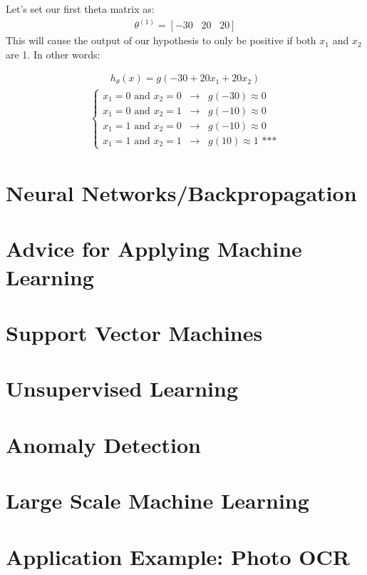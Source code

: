 \documentclass{article}
\begin{document}
            Let's set our first theta matrix as:
            \begin{align*}
                \theta^{(1)} = [-30 \; \; \; 20 \; \; \; 20]
            \end{align*}
            This will cause the output of our hypothesis to only be positive if both $x_1$ and $x_2$ are 1. In other words:
            
            \begin{align*}
                h_{\theta}(x) = g(-30 + 20x_1 + 20x_2)
            \end{align*}
            \begin{align*}
                \begin{cases}
                    x_1 = 0 \text{  and  } x_2 = 0 \; \; \longrightarrow \; \; g(-30) \approx 0 \\
                    x_1 = 0 \text{  and  } x_2 = 1 \; \; \longrightarrow \; \; g(-10) \approx 0 \\
                    x_1 = 1 \text{  and  } x_2 = 0 \; \; \longrightarrow \; \; g(-10) \approx 0 \\
                    x_1 = 1 \text{  and  } x_2 = 1 \; \; \longrightarrow \; \; g(10) \approx 1 \text{  ***}
                \end{cases}
            \end{align*}
    \newpage
    \section{Neural Networks/Backpropagation}



    \section{Advice for Applying Machine Learning}



    \section{Support Vector Machines}



    \section{Unsupervised Learning}



    \section{Anomaly Detection}



    \section{Large Scale Machine Learning}



    \section{Application Example: Photo OCR}
\end{document}
